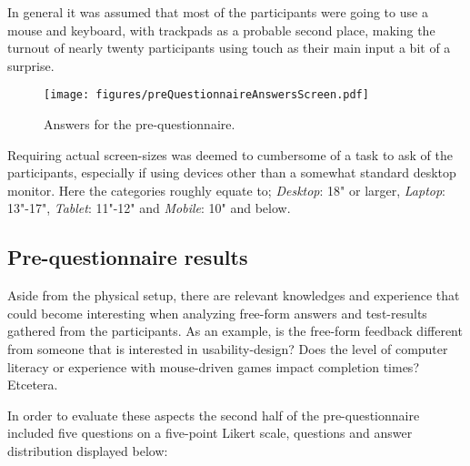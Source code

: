     \vspace{-0.2cm}
    In general it was assumed that most of the participants were going to
    use a mouse and keyboard, with trackpads as a probable second place,
    making the turnout of nearly twenty participants using touch as their
    main input a bit of a surprise.


    \begin{figure}[h!]
      \centering
      \texttt{[image: figures/preQuestionnaireAnswersScreen.pdf]}
      \vspace{-0.2cm}
      \caption{Answers for the pre-questionnaire.}
    \end{figure}

    \vspace{-0.4cm}
    Requiring actual screen-sizes was deemed to cumbersome of a task to
    ask of the participants, especially if using devices other than a
    somewhat standard desktop monitor. Here the categories roughly equate
    to; \textit{Desktop}: 18" or larger, \textit{Laptop}: 13"-17", \textit{Tablet}:
    11"-12" and \textit{Mobile}: 10" and below.

  \subsection{Pre-questionnaire results}

    Aside from the physical setup, there are relevant knowledges and
    experience that could become interesting when analyzing free-form
    answers and test-results gathered from the participants. As an example,
    is the free-form feedback different from someone that is interested in
    usability-design? Does the level of computer literacy or experience
    with mouse-driven games impact completion times? Etcetera.

    In order to evaluate these aspects the second half of the
    pre-questionnaire included five questions on a five-point Likert scale,
    questions and answer distribution displayed below:

